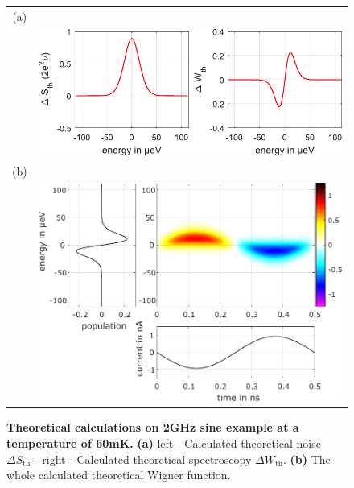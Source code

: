 \begin{figure}[hptb]
	\begin{center}
		\begin{tabular}{c c}
			(a) &  \\ 
			
			& \includegraphics[width = 10 cm]{./appA/Th_result} \\
			
			(b) &  \\ 
			
			& \includegraphics[width = 10 cm]{./appA/Th_wigner}
		\end{tabular} 
	\end{center}
	
	\caption{\textbf{Theoretical calculations on 2GHz sine example at a temperature of 60mK.} \textbf{(a)} left - Calculated theoretical noise $\Delta S_{\mathrm{th}}$ - right - Calculated theoretical spectroscopy $\Delta W_{\mathrm{th}}$. \textbf{(b)} The whole calculated theoretical Wigner function.}
	\label{fig: Theory}
\end{figure}


